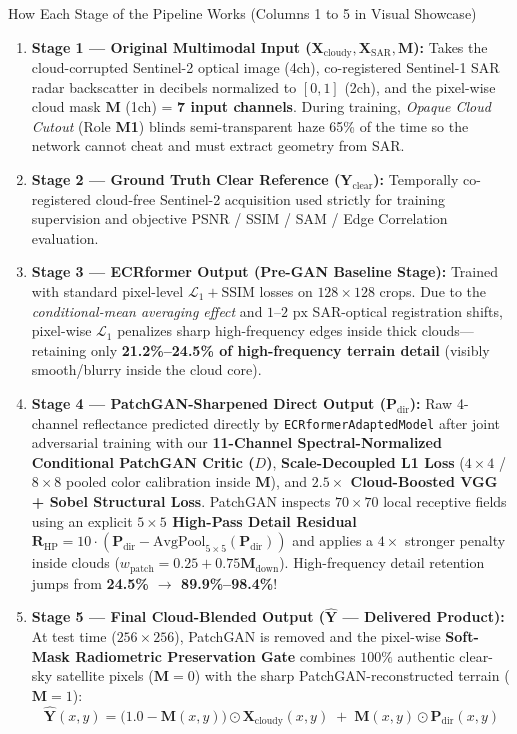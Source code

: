 \documentclass[10pt,a4paper]{article}
\begin{document}
\begin{stagebox}{How Each Stage of the Pipeline Works (Columns 1 to 5 in Visual Showcase)}
\small
\begin{enumerate}[leftmargin=15pt,itemsep=1.5pt,topsep=1pt]
    \item \textbf{Stage 1 — Original Multimodal Input ($\mathbf{X}_{\text{cloudy}}, \mathbf{X}_{\text{SAR}}, \mathbf{M}$):}
    Takes the cloud-corrupted Sentinel-2 optical image (4ch), co-registered Sentinel-1 SAR radar backscatter in decibels normalized to $[0, 1]$ (2ch), and the pixel-wise cloud mask $\mathbf{M}$ (1ch) = \textbf{7 input channels}. During training, \textit{Opaque Cloud Cutout} (Role \textbf{M1}) blinds semi-transparent haze 65\% of the time so the network cannot cheat and must extract geometry from SAR.
    \item \textbf{Stage 2 — Ground Truth Clear Reference ($\mathbf{Y}_{\text{clear}}$):}
    Temporally co-registered cloud-free Sentinel-2 acquisition used strictly for training supervision and objective PSNR / SSIM / SAM / Edge Correlation evaluation.
    \item \textbf{Stage 3 — ECRformer Output (Pre-GAN Baseline Stage):}
    Trained with standard pixel-level $\mathcal{L}_1 + \text{SSIM}$ losses on $128\times 128$ crops. Due to the \textit{conditional-mean averaging effect} and $1\text{--}2\text{ px}$ SAR-optical registration shifts, pixel-wise $\mathcal{L}_1$ penalizes sharp high-frequency edges inside thick clouds—retaining only \textbf{21.2\%--24.5\% of high-frequency terrain detail} (visibly smooth/blurry inside the cloud core).
    \item \textbf{Stage 4 — PatchGAN-Sharpened Direct Output ($\mathbf{P}_{\text{dir}}$):}
    Raw 4-channel reflectance predicted directly by \texttt{ECRformerAdaptedModel} after joint adversarial training with our \textbf{11-Channel Spectral-Normalized Conditional PatchGAN Critic ($D$)}, \textbf{Scale-Decoupled L1 Loss} ($4\times 4$ / $8\times 8$ pooled color calibration inside $\mathbf{M}$), and \textbf{$2.5\times$ Cloud-Boosted VGG + Sobel Structural Loss}. PatchGAN inspects $70\times 70$ local receptive fields using an explicit \textbf{$5\times 5$ High-Pass Detail Residual} $\mathbf{R}_{\text{HP}} = 10\cdot(\mathbf{P}_{\text{dir}} - \text{AvgPool}_{5\times 5}(\mathbf{P}_{\text{dir}}))$ and applies a $4\times$ stronger penalty inside clouds ($w_{\text{patch}} = 0.25 + 0.75\mathbf{M}_{\text{down}}$). High-frequency detail retention jumps from \textbf{24.5\% $\to$ 89.9\%--98.4\%}!
    \item \textbf{Stage 5 — Final Cloud-Blended Output ($\hat{\mathbf{Y}}$ — Delivered Product):}
    At test time ($256\times 256$), PatchGAN is removed and the pixel-wise \textbf{Soft-Mask Radiometric Preservation Gate} combines $100\%$ authentic clear-sky satellite pixels ($\mathbf{M}=0$) with the sharp PatchGAN-reconstructed terrain ($\mathbf{M}=1$):
    \vspace{-3pt}
    $$\hat{\mathbf{Y}}(x, y) = \big(1.0 - \mathbf{M}(x, y)\big) \odot \mathbf{X}_{\text{cloudy}}(x, y) \;+\; \mathbf{M}(x, y) \odot \mathbf{P}_{\text{dir}}(x, y)$$
    \vspace{-8pt}
\end{enumerate}
\end{stagebox}
\end{document}
